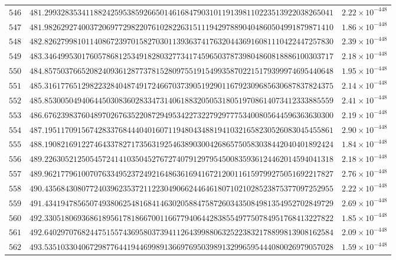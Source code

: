 \documentclass[12pt,reqno]{amsart}
\theoremstyle{remark}
\begin{document}
\begin{longtable}{clc}
$546$ & $481.2993283534118824259538592665014616847903101191398110223513922038265041$ & $2.22\times 10^{-448}$ \\
$547$ & $481.9826292740037206977298220761028226315111942978890404860504991879871410$ & $1.86\times 10^{-448}$ \\
$548$ & $482.8262799810114086723970158270301139363741763204436916081110422447257830$ & $2.39\times 10^{-448}$ \\
$549$ & $483.3464995301760578681253491828032773417459650378739804860818886100303717$ & $2.18\times 10^{-448}$ \\
$550$ & $484.8575037665208240936128773781528097551915499358702215179399974695440648$ & $1.95\times 10^{-448}$ \\
$551$ & $485.3161776512982232840487491724667037390519290116792309685630687837824375$ & $2.14\times 10^{-448}$ \\
$552$ & $485.8530050494064450308360283347314061883205053180519708614073412333885559$ & $2.41\times 10^{-448}$ \\
$553$ & $486.6762398376048970267635220872949534227322792977753400805644596363630300$ & $2.19\times 10^{-448}$ \\
$554$ & $487.1951170915674283376844404016071194804348819410321658230526083045455861$ & $2.90\times 10^{-448}$ \\
$555$ & $488.1908216912274643378271735631925463890300426865750583038442040401892424$ & $1.84\times 10^{-448}$ \\
$556$ & $489.2263052125054572414103504527672740791297954500835936124462014594041318$ & $2.18\times 10^{-448}$ \\
$557$ & $489.9621779610070763349523724921648636169416721200116159799275051692217827$ & $2.76\times 10^{-448}$ \\
$558$ & $490.4356843080772403962353721122304906624464618071021028523875377097252955$ & $2.22\times 10^{-448}$ \\
$559$ & $491.4341947856507493806254816841463020588475872603435084981354952702849729$ & $2.69\times 10^{-448}$ \\
$560$ & $492.3305180693686189561781866700116677940644283855497750784951768413227822$ & $1.85\times 10^{-448}$ \\
$561$ & $492.6402970768244751557436958037394112643998806325223832178899813908162584$ & $2.09\times 10^{-448}$ \\
$562$ & $493.5351033040672987764419446998913669769503989132996595444080026979057028$ & $1.59\times 10^{-448}$ \\

\end{longtable}
\end{document}
